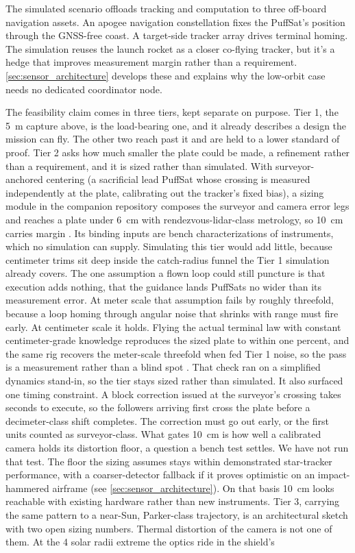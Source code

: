 \documentclass{article}
\begin{document}
The simulated scenario offloads tracking and computation to three off-board navigation assets. An apogee navigation constellation fixes the PuffSat's position through the GNSS-free coast. A target-side tracker array drives terminal homing. The simulation reuses the launch rocket as a closer co-flying tracker, but it's a hedge that improves measurement margin rather than a requirement. \autoref{sec:sensor_architecture} develops these and explains why the low-orbit case needs no dedicated coordinator node.

The feasibility claim comes in three tiers, kept separate on purpose. Tier 1, the \SI{5}{\meter} capture above, is the load-bearing one, and it already describes a design the mission can fly. The other two reach past it and are held to a lower standard of proof. Tier 2 asks how much smaller the plate could be made, a refinement rather than a requirement, and it is sized rather than simulated. With surveyor-anchored centering (a sacrificial lead PuffSat whose crossing is measured independently at the plate, calibrating out the tracker's fixed bias), a sizing module in the companion repository composes the surveyor and camera error legs and reaches a plate under \SI{6}{\centi\meter} with rendezvous-lidar-class metrology, so \SI{10}{\centi\meter} carries margin \cite{Katz_puffsat_control_sim_2026}. Its binding inputs are bench characterizations of instruments, which no simulation can supply. Simulating this tier would add little, because centimeter trims sit deep inside the catch-radius funnel the Tier 1 simulation already covers. The one assumption a flown loop could still puncture is that execution adds nothing, that the guidance lands PuffSats no wider than its measurement error. At meter scale that assumption fails by roughly threefold, because a loop homing through angular noise that shrinks with range must fire early. At centimeter scale it holds. Flying the actual terminal law with constant centimeter-grade knowledge reproduces the sized plate to within one percent, and the same rig recovers the meter-scale threefold when fed Tier 1 noise, so the pass is a measurement rather than a blind spot \cite{Katz_puffsat_control_sim_2026}. That check ran on a simplified dynamics stand-in, so the tier stays sized rather than simulated. It also surfaced one timing constraint. A block correction issued at the surveyor's crossing takes seconds to execute, so the followers arriving first cross the plate before a decimeter-class shift completes. The correction must go out early, or the first units counted as surveyor-class. What gates \SI{10}{\centi\meter} is how well a calibrated camera holds its distortion floor, a question a bench test settles. We have not run that test. The floor the sizing assumes stays within demonstrated star-tracker performance, with a coarser-detector fallback if it proves optimistic on an impact-hammered airframe (see \autoref{sec:sensor_architecture}). On that basis \SI{10}{\centi\meter} looks reachable with existing hardware rather than new instruments. Tier 3, carrying the same pattern to a near-Sun, Parker-class trajectory, is an architectural sketch with two open sizing numbers. Thermal distortion of the camera is not one of them. At the 4 solar radii extreme the optics ride in the shield's 
\end{document}
